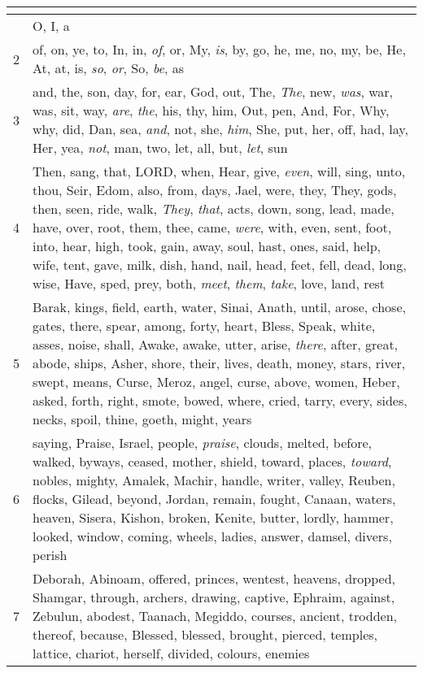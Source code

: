 \begin{center}
\begin{longtable}{l|p{3.75in}}
\hline \multicolumn{2}{c}{{ }} \\ \hline
\endfoot 
1 & O, I, a\\ \hline 
2 & of, on, ye, to, In, in, \emph{of}, or, My, \emph{is}, by, go, he, me, no, my, be, He, At, at, is, \emph{so}, \emph{or}, So, \emph{be}, as\\ \hline 
3 & and, the, son, day, for, ear, God, out, The, \emph{The}, new, \emph{was}, war, was, sit, way, \emph{are}, \emph{the}, his, thy, him, Out, pen, And, For, Why, why, did, Dan, sea, \emph{and}, not, she, \emph{him}, She, put, her, off, had, lay, Her, yea, \emph{not}, man, two, let, all, but, \emph{let}, sun\\ \hline 
4 & Then, sang, that, LORD, when, Hear, give, \emph{even}, will, sing, unto, thou, Seir, Edom, also, from, days, Jael, were, they, They, gods, then, seen, ride, walk, \emph{They}, \emph{that}, acts, down, song, lead, made, have, over, root, them, thee, came, \emph{were}, with, even, sent, foot, into, hear, high, took, gain, away, soul, hast, ones, said, help, wife, tent, gave, milk, dish, hand, nail, head, feet, fell, dead, long, wise, Have, sped, prey, both, \emph{meet}, \emph{them}, \emph{take}, love, land, rest\\ \hline 
5 & Barak, kings, field, earth, water, Sinai, Anath, until, arose, chose, gates, there, spear, among, forty, heart, Bless, Speak, white, asses, noise, shall, Awake, awake, utter, arise, \emph{there}, after, great, abode, ships, Asher, shore, their, lives, death, money, stars, river, swept, means, Curse, Meroz, angel, curse, above, women, Heber, asked, forth, right, smote, bowed, where, cried, tarry, every, sides, necks, spoil, thine, goeth, might, years\\ \hline 
6 & saying, Praise, Israel, people, \emph{praise}, clouds, melted, before, walked, byways, ceased, mother, shield, toward, places, \emph{toward}, nobles, mighty, Amalek, Machir, handle, writer, valley, Reuben, flocks, Gilead, beyond, Jordan, remain, fought, Canaan, waters, heaven, Sisera, Kishon, broken, Kenite, butter, lordly, hammer, looked, window, coming, wheels, ladies, answer, damsel, divers, perish\\ \hline 
7 & Deborah, Abinoam, offered, princes, wentest, heavens, dropped, Shamgar, through, archers, drawing, captive, Ephraim, against, Zebulun, abodest, Taanach, Megiddo, courses, ancient, trodden, thereof, because, Blessed, blessed, brought, pierced, temples, lattice, chariot, herself, divided, colours, enemies\\ \hline 

\end{longtable}
\end{center}
